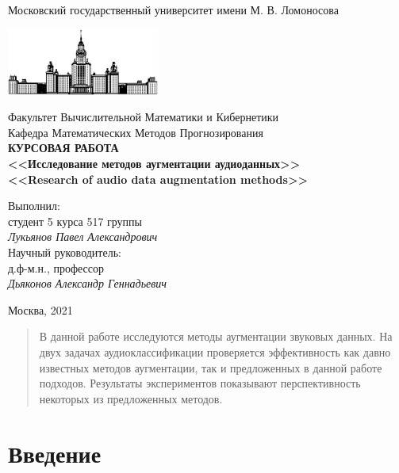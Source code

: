 \documentclass[12pt, fleqn]{article}
\begin{document}
	
	\begin{titlepage}
		\begin{center}
			Московский государственный университет имени М. В. Ломоносова
			
			\bigskip
			\includegraphics[width=50mm]{msu.eps}
			
			\bigskip
			Факультет Вычислительной Математики и Кибернетики\\
			Кафедра Математических Методов Прогнозирования\\[10mm]
			
			\textsf{\large\bfseries
				КУРСОВАЯ РАБОТА\\[10mm]
				<<Исследование методов аугментации аудиоданных>>\\
				<<Research of audio data augmentation methods>>
			}\\[10mm]
			
			\begin{flushright}
				\parbox{0.5\textwidth}{
					Выполнил:\\
					студент 5 курса 517 группы\\
					\emph{Лукьянов Павел Александрович}\\[5mm]
					Научный руководитель:\\
					д.ф-м.н., профессор\\
					\emph{Дьяконов Александр Геннадьевич}
				}
			\end{flushright}
			
			\vspace{\fill}
			Москва, 2021
		\end{center}
	\end{titlepage}
	
	\newpage
	\renewcommand{\contentsname}{Содержание}
	\tableofcontents
	
	\newpage
	\begin{abstract}
		В данной работе исследуются методы аугментации звуковых данных. На двух задачах аудиоклассификации проверяется эффективность как давно известных методов аугментации, так и предложенных в данной работе подходов. Результаты экспериментов показывают перспективность некоторых из предложенных методов.
	\end{abstract}
	
	\newpage
	\section{Введение}
	
\end{document}
